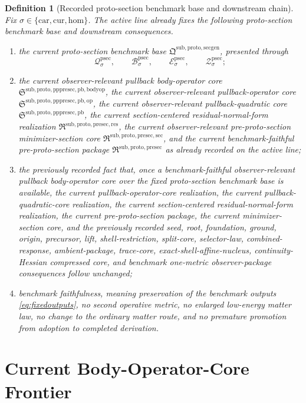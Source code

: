 \documentclass[11pt]{article}
\newcommand{\Car}{\mathrm{car}}
\newcommand{\Cur}{\mathrm{cur}}
\newcommand{\Hom}{\mathrm{hom}}
\newcommand{\ProtoSectionPackage}{\mathfrak Q^{\mathrm{sub,proto,secgen}}}
\newcommand{\ProtoSectionState}[1]{\mathcal Q_{#1}^{\mathrm{psec}}}
\newcommand{\ProtoSectionBody}[1]{\mathcal B_{#1}^{\mathrm{psec}}}
\newcommand{\ProtoSectionFunctional}[1]{\mathscr E_{#1}^{\mathrm{psec}}}
\newcommand{\ProtoSectionShell}[1]{\mathcal Z_{#1}^{\mathrm{psec}}}
\newcommand{\PreProtoSectionPackage}{\mathfrak R^{\mathrm{sub,proto,presec}}}
\newcommand{\PreProtoSectionMinSectionCore}{\mathfrak R^{\mathrm{sub,proto,presec,sec}}}
\newcommand{\PreProtoSectionResidualPackage}{\mathfrak R^{\mathrm{sub,proto,presec,res}}}
\newcommand{\PrePreProtoSectionPullbackCore}{\mathfrak S^{\mathrm{sub,proto,pppresec,pb}}}
\newcommand{\PullbackOperatorCore}{\mathfrak S^{\mathrm{sub,proto,pppresec,pb,op}}}
\newcommand{\PullbackBodyOperatorCore}{\mathfrak S^{\mathrm{sub,proto,pppresec,pb,bodyop}}}
\newtheorem{definition}{Definition}
\begin{document}
\begin{definition}[Recorded proto-section benchmark base and downstream chain]
\label{def:downstream}
Fix \(\sigma\in\{\Car,\Cur,\Hom\}\). The active line already fixes the following proto-section benchmark base and downstream consequences.
\begin{enumerate}
    \item the current proto-section benchmark base \(\ProtoSectionPackage\), presented through
    \[
    \ProtoSectionState{\sigma},\qquad
    \ProtoSectionBody{\sigma},\qquad
    \ProtoSectionFunctional{\sigma},\qquad
    \ProtoSectionShell{\sigma};
    \]
    \item the current observer-relevant pullback body-operator core \(\PullbackBodyOperatorCore\), the current observer-relevant pullback-operator core \(\PullbackOperatorCore\), the current observer-relevant pullback-quadratic core \(\PrePreProtoSectionPullbackCore\), the current section-centered residual-normal-form realization \(\PreProtoSectionResidualPackage\), the current observer-relevant pre-proto-section minimizer-section core \(\PreProtoSectionMinSectionCore\), and the current benchmark-faithful pre-proto-section package \(\PreProtoSectionPackage\) as already recorded on the active line;
    \item the previously recorded fact that, once a benchmark-faithful observer-relevant pullback body-operator core over the fixed proto-section benchmark base is available, the current pullback-operator-core realization, the current pullback-quadratic-core realization, the current section-centered residual-normal-form realization, the current pre-proto-section package, the current minimizer-section core, and the previously recorded seed, root, foundation, ground, origin, precursor, lift, shell-restriction, split-core, selector-law, combined-response, ambient-package, trace-core, exact-shell-affine-nucleus, continuity-Hessian compressed core, and benchmark one-metric observer-package consequences follow unchanged;
    \item benchmark faithfulness, meaning preservation of the benchmark outputs \eqref{eq:fixedoutputs}, no second operative metric, no enlarged low-energy matter law, no change to the ordinary matter route, and no premature promotion from adoption to completed derivation.
\end{enumerate}
\end{definition}

\section{Current Body-Operator-Core Frontier}
\end{document}
